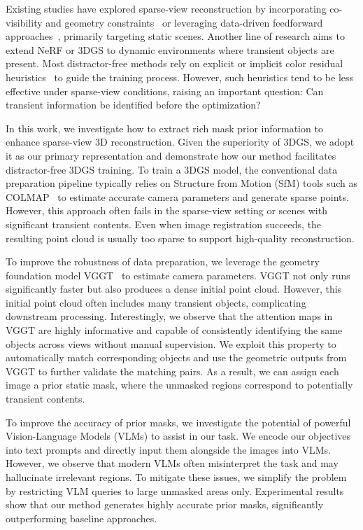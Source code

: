 \documentclass[letterpaper, 10 pt, conference]{ieeeconf}  %
\begin{document}
Existing studies have explored sparse-view reconstruction by incorporating co-visibility and geometry constraints~\cite{zhang2024cor, li2024dngaussian} or leveraging data-driven feedforward approaches~\cite{chen2024mvsplat, ye2025nop, zhang2025FLARE}, primarily targeting static scenes. Another line of research aims to extend NeRF or 3DGS to dynamic environments where transient objects are present. Most distractor-free methods rely on explicit or implicit color residual heuristics~\cite{sabour2023robustnerf, chen2024nerf} to guide the training process. However, such heuristics tend to be less effective under sparse-view conditions, raising an important question: Can transient information be identified before the optimization?

In this work, we investigate how to extract rich mask prior information to enhance sparse-view 3D reconstruction. Given the superiority of 3DGS, we adopt it as our primary representation and demonstrate how our method facilitates distractor-free 3DGS training. To train a 3DGS model, the conventional data preparation pipeline typically relies on Structure from Motion (SfM) tools such as COLMAP~\cite{schonberger2016structure} to estimate accurate camera parameters and generate sparse points. However, this approach often fails in the sparse-view setting or scenes with significant transient contents. Even when image registration succeeds, the resulting point cloud is usually too sparse to support high-quality reconstruction.

To improve the robustness of data preparation, we leverage the geometry foundation model VGGT~\cite{wang2025vggt} to estimate camera parameters. VGGT not only runs significantly faster but also produces a dense initial point cloud. However, this initial point cloud often includes many transient objects, complicating downstream processing. Interestingly, we observe that the attention maps in VGGT are highly informative and capable of consistently identifying the same objects across views without manual supervision. We exploit this property to automatically match corresponding objects and use the geometric outputs from VGGT to further validate the matching pairs. As a result, we can assign each image a prior static mask, where the unmasked regions correspond to potentially transient contents.

To improve the accuracy of prior masks, we investigate the potential of powerful Vision-Language Models (VLMs) to assist in our task. We encode our objectives into text prompts and directly input them alongside the images into VLMs. However, we observe that modern VLMs often misinterpret the task and may hallucinate irrelevant regions. To mitigate these issues, we simplify the problem by restricting VLM queries to large unmasked areas only. Experimental results show that our method generates highly accurate prior masks, significantly outperforming baseline approaches.
\end{document}

